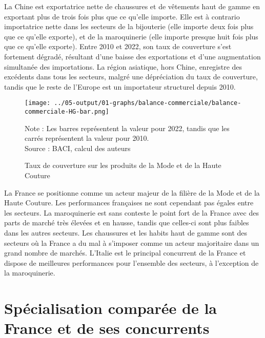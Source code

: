 \documentclass[french,10pt,a4paper]{article}
\begin{document}
La Chine est exportatrice nette de chaussures et de vêtements haut de gamme en exportant plus de trois fois plus que ce qu'elle importe. Elle est à contrario importatrice nette dans les secteurs de la bijouterie (elle importe deux fois plus que ce qu'elle exporte), et de la maroquinerie (elle importe presque huit fois plus que ce qu'elle exporte). Entre 2010 et 2022, son taux de couverture s'est fortement dégradé, résultant d'une baisse des exportations et d'une augmentation simultanée des importations. La région asiatique, hors Chine, enregistre des excédents dans tous les secteurs, malgré une dépréciation du taux de couverture, tandis que le reste de l'Europe est un importateur structurel depuis 2010.

\begin{figure}[!h]
  \centering
  \texttt{[image: ../05-output/01-graphs/balance-commerciale/balance-commerciale-HG-bar.png]}
  \captionsetup{justification=justified, singlelinecheck=false, font=small}
  \caption*{Note : Les barres représentent la valeur pour 2022, tandis que les carrés représentent la valeur pour 2010. \\
  Source : BACI, calcul des auteurs}
  \captionsetup{justification=centering, singlelinecheck=true, font=normalsize}
  \caption{Taux de couverture sur les produits de la Mode et de la Haute Couture}
  \label{fig:balance-commerciale}
\end{figure}

\bigskip

La France se positionne comme un acteur majeur de la filière de la Mode et de la Haute Couture. Les performances françaises ne sont cependant pas égales entre les secteurs. La maroquinerie est sans conteste le point fort de la France avec des parts de marché très élevées et en hausse, tandis que celles-ci sont plus faibles dans les autres secteurs. Les chaussures et les habits haut de gamme sont des secteurs où la France a du mal à s'imposer comme un acteur majoritaire dans un grand nombre de marchés. L'Italie est le principal concurrent de la France et dispose de meilleures performances pour l'ensemble des secteurs, à l'exception de la maroquinerie. 






\newpage
{}

\section{Spécialisation comparée de la France et de ses concurrents}
\end{document}

